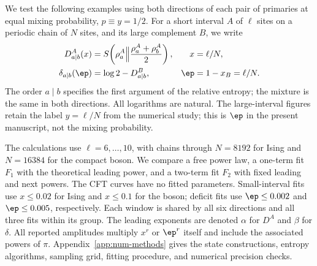 We test the following examples using both directions of each pair of
primaries at equal mixing probability, $p\equiv y=1/2$. For a short
interval $A$ of $\ell$ sites on a periodic chain of $N$ sites, and its
large complement $B$, we write
\begin{align}
 D^A_{a\mid b}(x)&=S\!\left(\rho_a^A\Big\|
                    \frac{\rho_a^A+\rho_b^A}{2}\right),
       &x&=\ell/N,\nonumber\\
 \delta_{a\mid b}(\ep)&=\log2-D^B_{a\mid b},
       &\ep&=1-x_B=\ell/N.
 \label{eq:num-observables}
\end{align}
The order $a\mid b$ specifies the first argument of the relative
entropy; the mixture is the same in both directions. All logarithms
are natural. The large-interval figures retain the label $y=\ell/N$
from the numerical study; this is $\ep$ in the present manuscript,
not the mixing probability.

The calculations use $\ell=6,\ldots,10$, with chains through $N=8192$
for Ising and $N=16384$ for the compact boson. We compare a free
power law, a one-term fit $F_1$ with the theoretical leading power,
and a two-term fit $F_2$ with fixed leading and next powers. The CFT
curves have no fitted parameters. Small-interval fits use $x\leq0.02$
for Ising and $x\leq0.1$ for the boson; deficit fits use
$\ep\leq0.002$ and $\ep\leq0.005$, respectively. Each window is
shared by all six directions and all three fits within its group.
The leading exponents are denoted $\alpha$ for $D^A$ and $\beta$
for $\delta$. All reported amplitudes multiply $x^r$ or $\ep^r$
itself and include the associated powers of $\pi$.
Appendix~\ref{app:num-methods} gives the state constructions,
entropy algorithms, sampling grid, fitting procedure, and numerical
precision checks.
